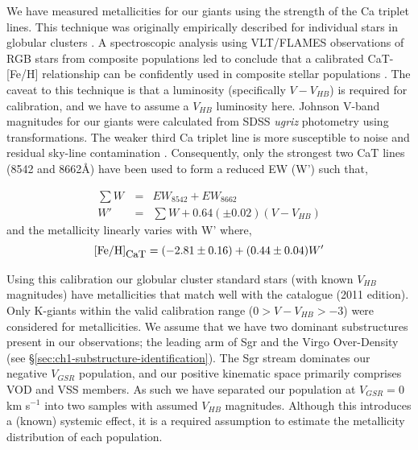 We have measured metallicities for our giants using the strength of the Ca triplet lines. This technique was originally empirically described for individual stars in globular  clusters \citep{Armandroff;Da-Costa_1991}. A spectroscopic analysis using VLT/FLAMES observations of RGB stars from composite populations led \citet{Battaglia;et-al_2008} to conclude that a calibrated CaT-[Fe/H] relationship can be confidently used in composite stellar populations \citep[see also][]{Rutledge;Hesser;Stetson_1997, Starkenburg;et-al_2010}. The caveat to this technique is that a luminosity (specifically $V - V_{HB}$) is required for calibration, and we have to assume a $V_{HB}$ luminosity here. Johnson V-band magnitudes for our giants were calculated from SDSS \textit{ugriz} photometry using \citet{Jester;et-al_2005} transformations. The weaker third Ca triplet line is more susceptible to noise and residual sky-line contamination \citep{Tolstoy;et-al_2001,Battaglia;et-al_2008}. Consequently, only the strongest two CaT lines (8542 and 8662\AA) have been used to form a reduced EW (W') such that,

\begin{eqnarray}
	\textstyle\sum{W}\, &=& EW_{8542} + EW_{8662} \\
	W' &=&\textstyle\sum{W} + 0.64\left(\pm 0.02\right)\left(V-V_{HB}\right)
\end{eqnarray}
\noindent and the metallicity linearly varies with W' where,
\begin{equation}
	\mbox{[Fe/H]}_{\mbox{\small{CaT}}} = (-2.81\pm0.16) + (0.44\pm0.04) W'
	\label{eq:feh-cat}
\end{equation}

Using this calibration our globular cluster standard stars (with known $V_{HB}$ magnitudes) have metallicities that match well with the \citet{Harris_1996} catalogue (2011 edition). Only K-giants within the valid calibration range ($0 > V-V_{HB} > -3$) were considered for metallicities. We assume that we have two dominant substructures present in our observations; the leading arm of Sgr and the Virgo Over-Density (see \S\ref{sec:ch1-substructure-identification}). The Sgr stream dominates our negative $V_{GSR}$ population, and our positive kinematic space primarily comprises VOD and VSS members. As such we have separated our population at $V_{GSR} = 0$ km s$^{-1}$ into two samples with assumed $V_{HB}$ magnitudes. Although this introduces a (known) systemic effect, it is a required assumption to estimate the metallicity distribution of each population.

